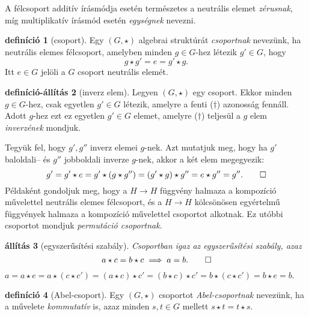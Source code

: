 \documentclass[9pt, a4paper, showtrims]{memoir}
\makeatletter
\renewenvironment{proof}[1][\proofname]
    {\par\pushQED{\qed}%
    \normalfont \topsep6\p@\@plus6\p@\relax
    \trivlist
    \item[\hskip\labelsep
        \itshape
    #1\@addpunct{:}]\ignorespaces}
    {\popQED\endtrivlist\@endpefalse}
\theoremstyle{plain}
\newtheorem{proposition}{állítás}[chapter]
\theoremstyle{remark}
\theoremstyle{definition}
\newtheorem{definition}[proposition]{definíció}
\newtheorem{defprop}[proposition]{definíció-állítás}
\makeatother
\begin{document}
A félcsoport additív írásmódja esetén természetes a neutrális elemet \emph{zérusnak},
míg multiplikatív írásmód esetén \emph{egységnek} nevezni.
\begin{definition}[csoport]
    Egy $\left( G,\star \right)$ algebrai struktúrát \emph{csoportnak} nevezünk,
    ha neutrális elemes félcsoport, amelyben minden $g\in G$-hez létezik $g'\in G$, hogy
    \[
        g\star g'=e=g'\star g.\tag{\dag}
    \]
    Itt $e\in G$ jelöli a $G$ csoport neutrális elemét.
\end{definition}
\begin{defprop}[inverz elem]
    Legyen $\left( G,\star \right)$ egy csoport.
    Ekkor minden $g\in G$-hez, csak egyetlen $g'\in G$ létezik, 
    amelyre a fenti ($\dag$) azonosság fennáll.
    Adott $g$-hez ezt ez egyetlen $g'\in G$ elemet, 
    amelyre ($\dag$) teljesül a $g$ elem \emph{inverzének} mondjuk.
\end{defprop}
\begin{proof}
    Tegyük fel, hogy $g',g''$ inverz elemei $g$-nek.
    Azt mutatjuk meg, hogy ha $g'$ baloldali-- és $g''$ jobboldali inverze $g$-nek,
    akkor a két elem megegyezik:
    \[
        g'=g'\star e=
        g'\star\left( g\star g'' \right)=
        \left(g'\star g\right)\star g'' =
        e\star g''=g''.\qedhere
    \]
\end{proof}
Példaként gondoljuk meg, hogy a $H\to H$ függvény halmaza a kompozíció művelettel
neutrális elemes félcsoport, és a $H\to H$ kölcsönösen egyértelmű függvények halmaza a kompozíció művelettel csoportot alkotnak. 
Ez utóbbi csoportot mondjuk \emph{permutáció csoportnak}.
\begin{proposition}[egyszerűsítési szabály]
    Csoportban igaz az egyszerűsítési szabály, azaz
    \[
        a\star c=b\star c\implies a=b.\qedhere
    \]
\end{proposition}
\begin{proof}
    \begin{math}
        a=a\star e
        =
        a\star \left( c\star c'\right)=
        \left( a\star c \right)\star c'=
        \left( b\star c \right)\star c'=
        b\star\left( c\star c' \right)=
        b\star e=
        b.
    \end{math}
\end{proof}
\begin{definition}[Abel-csoport]
    Egy $\left( G,\star \right)$ csoportot \emph{Abel-csoportnak} nevezünk,
    ha a művelete \emph{kommutatív} is, 
    azaz minden $s,t\in G$ mellett $s\star t=t\star s$.
\end{definition}
\end{document}
